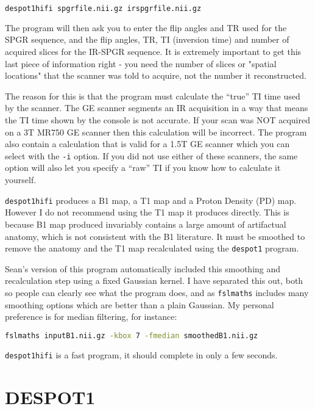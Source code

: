 \documentclass{report}
\begin{document}
\begin{lstlisting}[language=sh]
despot1hifi spgrfile.nii.gz irspgrfile.nii.gz
\end{lstlisting}

The program will then ask you to enter the flip angles and TR used for the SPGR sequence, and the flip angles, TR, TI (inversion time) and number of acquired slices for the IR-SPGR sequence. It is extremely important to get this last piece of information right - you need the number of slices or "spatial locations" that the scanner was told to acquire, not the number it reconstructed.

The reason for this is that the program must calculate the ``true'' TI time used by the scanner. The GE scanner segments an IR acquisition in a way that means the TI time shown by the console is not accurate. If your scan was NOT acquired on a 3T MR750 GE scanner then this calculation will be incorrect. The program also contain a calculation that is valid for a 1.5T GE scanner which you can select with the \texttt{-i} option. If you did not use either of these scanners, the same option will also let you specify a ``raw'' TI if you know how to calculate it yourself.

\texttt{despot1hifi} produces a B1 map, a T1 map and a Proton Density (PD) map. However I do not recommend using the T1 map it produces directly. This is because B1 map produced invariably contains a large amount of artifactual anatomy, which is not consistent with the B1 literature. It must be smoothed to remove the anatomy and the T1 map recalculated using the \texttt{despot1} program.

Sean's version of this program automatically included this smoothing and recalculation step using a fixed Gaussian kernel. I have separated this out, both so people can clearly see what the program does, and as \texttt{fslmaths} includes many smoothing options which are better than a plain Gaussian. My personal preference is for median filtering, for instance:

\begin{lstlisting}[language=sh]
fslmaths inputB1.nii.gz -kbox 7 -fmedian smoothedB1.nii.gz
\end{lstlisting}

\texttt{despot1hifi} is a fast program, it should complete in only a few seconds.

\section{DESPOT1}
\end{document}

